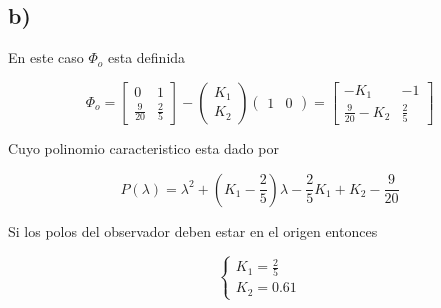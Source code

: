 \documentclass[11pt,a4paper]{article}
\newcommand{\siseq}[1]{ \left\{ \begin{array}{c}
    #1
\end{array} \right. }
\begin{document}
    \subsection*{b)}

    En este caso $\Phi_o$ esta definida

    \begin{equation}
        \Phi_o = 
        \begin{bmatrix}
            0 & 1 \\
            \frac{9}{20} & \frac{2}{5}
        \end{bmatrix}
        -
        \begin{pmatrix}
            K_1 \\ K_2
        \end{pmatrix}
        \begin{pmatrix}
            1 & 0
        \end{pmatrix} = 
        \begin{bmatrix}
            -K_1 & -1 \\
            \frac{9}{20} - K_2 & \frac{2}{5}
        \end{bmatrix}
    \end{equation}

    Cuyo polinomio caracteristico esta dado por 

    \begin{equation}
        P(\lambda) = \lambda^2 + \left( K_1 - \frac{2}{5} \right) \lambda - \frac{2}{5}K_1 + K_2 - \frac{9}{20}
    \end{equation}

    Si los polos del observador deben estar en el origen entonces 

    \begin{equation}
        \siseq{
            K_1 = \frac{2}{5} \\ 
            K_2 = 0.61
        }
    \end{equation}
\end{document}
